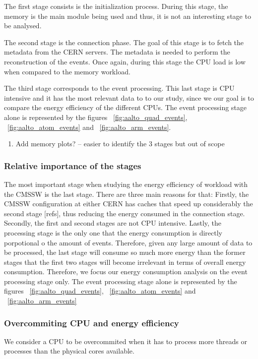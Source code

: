 The first stage consists is the initialization process. During this stage, the memory is the main module being used and thus, it is not an interesting stage to be analysed. 

The second stage is the connection phase. The goal of this stage is to fetch the metadata from
the CERN servers. The metadata is needed to perform the reconstruction of the events. Once again, 
during this stage the CPU load is low when compared to the memory workload. 

The third stage corresponds to the event processing. This last stage is CPU intensive and it has the most relevant data to to our study, since we our goal is to compare the energy efficiency of the different CPUs. The event processing stage alone is represented by 
the figures ~\ref{fig:aalto_quad_events}, ~\ref{fig:aalto_atom_events} and ~\ref{fig:aalto_arm_events}.

\begin{enumerate}
\item Add memory plots? -- easier to identify the 3 stages but out of scope
\end{enumerate}


\subsubsection*{Relative importance of the stages}
The most important stage when studying the energy efficiency of
workload with the CMSSW is the last stage. There are three main reasons for that: Firstly, the CMSSW configuration at either CERN has caches that speed up considerably the second stage [refs], thus reducing the energy consumed in the connection stage.
Secondly, the first and second stages are not CPU intensive.
Lastly, the processing stage is the only one that the energy consumption is directly porpotional o the amount of events. Therefore, given any large amount of
data to be processed, the last stage will consume so much more energy than the former stages that the first two stages will become irrelevant in terms of overall energy consumption. Therefore, we focus our energy consumption analysis on the event processing stage only. The event processing stage alone is represented by the figures ~\ref{fig:aalto_quad_events}, ~\ref{fig:aalto_atom_events} and ~\ref{fig:aalto_arm_events}


\subsubsection*{Overcommiting CPU and energy efficiency}
We consider a CPU to be overcommited when it has to process more threads or processes than the physical cores available.

